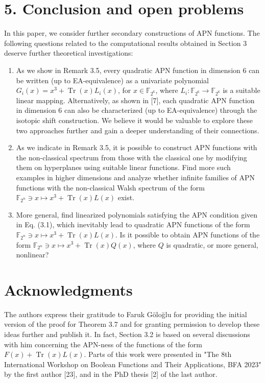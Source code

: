 \documentclass[10pt]{article}
\begin{document}
\section*{5. Conclusion and open problems}
In this paper, we consider further secondary constructions of APN functions. The following questions related to the computational results obtained in Section 3 deserve further theoretical investigations:

\begin{enumerate}
  \item As we show in Remark 3.5, every quadratic APN function in dimension 6 can be written (up to EA-equivalence) as a univariate polynomial $G_{i}(x)= x^{3}+\operatorname{Tr}(x) L_{i}(x)$, for $x \in \mathbb{F}_{2^{6}}$, where $L_{i}: \mathbb{F}_{2^{6}} \rightarrow \mathbb{F}_{2^{6}}$ is a suitable linear mapping. Alternatively, as shown in [7], each quadratic APN function in dimension 6 can also be characterized (up to EA-equivalence) through the isotopic shift construction. We believe it would be valuable to explore these two approaches further and gain a deeper understanding of their connections.
  \item As we indicate in Remark 3.5, it is possible to construct APN functions with the non-classical spectrum from those with the classical one by modifying them on hyperplanes using suitable linear functions. Find more such examples in higher dimensions and analyze whether infinite families of APN functions with the non-classical Walsh spectrum of the form $\mathbb{F}_{2^{n}} \ni x \mapsto x^{3}+\operatorname{Tr}(x) L(x)$ exist.
  \item More general, find linearized polynomials satisfying the APN condition given in Eq. (3.1), which inevitably lead to quadratic APN functions of the form $\mathbb{F}_{2^{n}} \ni x \mapsto x^{3}+\operatorname{Tr}(x) L(x)$. Is it possible to obtain APN functions of the form $\mathbb{F}_{2^{n}} \ni x \mapsto x^{3}+\operatorname{Tr}(x) Q(x)$, where $Q$ is quadratic, or more general, nonlinear?
\end{enumerate}

\section*{Acknowledgments}
The authors express their gratitude to Faruk Göloğlu for providing the initial version of the proof for Theorem 3.7 and for granting permission to develop these ideas further and publish it. In fact, Section 3.2 is based on several discussions with him concerning the APN-ness of the functions of the form $F(x)+\operatorname{Tr}(x) L(x)$. Parts of this work were presented in "The 8th International Workshop on Boolean Functions and Their Applications, BFA 2023" by the first author [23], and in the PhD thesis [2] of the last author.
\end{document}
